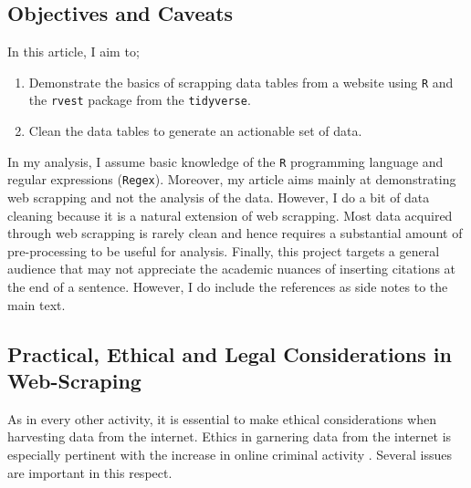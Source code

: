 \documentclass[]{tufte-handout}
\providecommand{\tightlist}{%
  \setlength{\itemsep}{0pt}\setlength{\parskip}{0pt}}
\begin{document}
\hypertarget{objectives-and-caveats}{%
\subsection{\texorpdfstring{\textbf{Objectives and
Caveats}}{Objectives and Caveats}}\label{objectives-and-caveats}}

In this article, I aim to;

\begin{enumerate}
\def\labelenumi{\arabic{enumi}.}
\tightlist
\item
  Demonstrate the basics of scrapping data tables from a website using
  \texttt{R} and the \texttt{rvest} package from the \texttt{tidyverse}.
\item
  Clean the data tables to generate an actionable set of data.
\end{enumerate}

In my analysis, I assume basic knowledge of the \texttt{R} programming
language and regular expressions (\texttt{Regex}). Moreover, my article
aims mainly at demonstrating web scrapping and not the analysis of the
data. However, I do a bit of data cleaning because it is a natural
extension of web scrapping. Most data acquired through web scrapping is
rarely clean and hence requires a substantial amount of pre-processing
to be useful for analysis. Finally, this project targets a general
audience that may not appreciate the academic nuances of inserting
citations at the end of a sentence. However, I do include the references
as side notes to the main text.

\hypertarget{practical-ethical-and-legal-considerations-in-web-scraping}{%
\subsection{\texorpdfstring{\textbf{Practical, Ethical and Legal
Considerations in
Web-Scraping}}{Practical, Ethical and Legal Considerations in Web-Scraping}}\label{practical-ethical-and-legal-considerations-in-web-scraping}}

As in every other activity, it is essential to make ethical
considerations when harvesting data from the internet. Ethics in
garnering data from the internet is especially pertinent with the
increase in online criminal activity \citep{krotov2018legality}. Several
issues are important in this respect.
\end{document}
